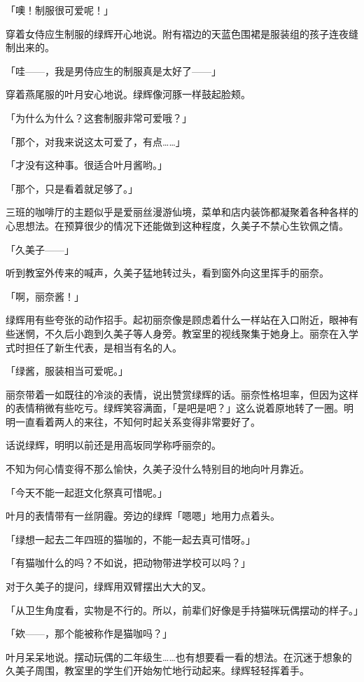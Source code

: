 \documentclass[UTF8]{ctexart}
\begin{document}
    「噢！制服很可爱呢！」

    穿着女侍应生制服的绿辉开心地说。附有褶边的天蓝色围裙是服装组的孩子连夜缝制出来的。

    「哇——，我是男侍应生的制服真是太好了——」

    穿着燕尾服的叶月安心地说。绿辉像河豚一样鼓起脸颊。

    「为什么为什么？这套制服非常可爱哦？」

    「那个，对我来说这太可爱了，有点……」

    「才没有这种事。很适合叶月酱哟。」

    「那个，只是看着就足够了。」

    三班的咖啡厅的主题似乎是爱丽丝漫游仙境，菜单和店内装饰都凝聚着各种各样的心思想法。在预算很少的情况下还能做到这种程度，久美子不禁心生钦佩之情。

    「久美子——」

    听到教室外传来的喊声，久美子猛地转过头，看到窗外向这里挥手的丽奈。

    「啊，丽奈酱！」

    绿辉用有些夸张的动作招手。起初丽奈像是顾虑着什么一样站在入口附近，眼神有些迷惘，不久后小跑到久美子等人身旁。教室里的视线聚集于她身上。丽奈在入学式时担任了新生代表，是相当有名的人。

    「绿酱，服装相当可爱呢。」

    丽奈带着一如既往的冷淡的表情，说出赞赏绿辉的话。丽奈性格坦率，但因为这样的表情稍微有些吃亏。绿辉笑容满面，「是吧是吧？」这么说着原地转了一圈。明明一直看着两人的来往，不知何时起关系变得非常要好了。

    话说绿辉，明明以前还是用高坂同学称呼丽奈的。

    不知为何心情变得不那么愉快，久美子没什么特别目的地向叶月靠近。

    「今天不能一起逛文化祭真可惜呢。」

    叶月的表情带有一丝阴霾。旁边的绿辉「嗯嗯」地用力点着头。

    「绿想一起去二年四班的猫咖的，不能一起去真可惜呀。」

    「有猫咖什么的吗？不如说，把动物带进学校可以吗？」

    对于久美子的提问，绿辉用双臂摆出大大的叉。

    「从卫生角度看，实物是不行的。所以，前辈们好像是手持猫咪玩偶摆动的样子。」

    「欸——，那个能被称作是猫咖吗？」

    叶月呆呆地说。摆动玩偶的二年级生……也有想要看一看的想法。在沉迷于想象的久美子周围，教室里的学生们开始匆忙地行动起来。绿辉轻轻挥着手。
\end{document}
